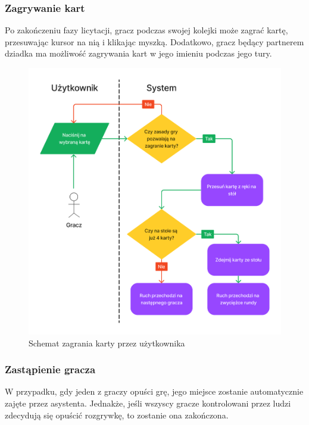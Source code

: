 \FloatBarrier

\subsubsection{Zagrywanie kart}

Po zakończeniu fazy licytacji, gracz podczas swojej kolejki może zagrać kartę,
przesuwając kursor na nią i klikając myszką. Dodatkowo, gracz będący partnerem dziadka
ma możliwość zagrywania kart w jego imieniu podczas jego tury.

\begin{figure}[h!]
  \centering
  \includegraphics[width=\textwidth]{img/schematy/play_card.png}
  \caption{Schemat zagrania karty przez użytkownika}
\end{figure}

\FloatBarrier

\subsubsection{Zastąpienie gracza}
W przypadku, gdy jeden z graczy opuści grę, jego miejsce zostanie automatycznie
zajęte przez asystenta. Jednakże, jeśli wszyscy gracze kontrolowani przez ludzi
zdecydują się opuścić rozgrywkę, to zostanie ona zakończona.

